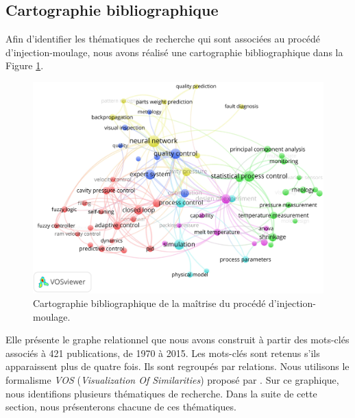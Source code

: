 \subsection{Cartographie bibliographique} \label{subsec:injection_research}
Afin d'identifier les thématiques de recherche qui sont associées au procédé d'injection-moulage, nous avons réalisé une cartographie bibliographique dans la Figure \ref{fig:cartographie}.

\begin{figure}[bhtp]
	\centering
	\includegraphics[width=\textwidth,height=\textheight,keepaspectratio]{../Chap1/Figures/tagMapFinalPubliOccurence.jpg}
	\caption{Cartographie bibliographique de la maîtrise du procédé d'injection-moulage.}
	\label{fig:cartographie}
\end{figure}

Elle présente le graphe relationnel que nous avons construit à partir des mots-clés associés à 421 publications, de 1970 à 2015.
Les mots-clés sont retenus s’ils apparaissent plus de quatre fois.
Ils sont regroupés par relations.
Nous utilisons le formalisme \textit{VOS} (\textit{Visualization Of Similarities}) proposé par \citeauthor{vaneck_vos_2006} \cite{vaneck_vos_2006, van_eck_comparison_2010}.
Sur ce graphique, nous identifions plusieurs thématiques de recherche.
Dans la suite de cette section, nous présenterons chacune de ces thématiques.

